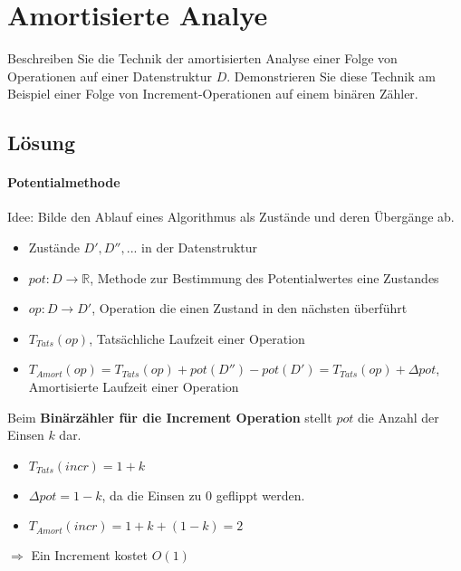 \section{Amortisierte Analye} 
	Beschreiben Sie die Technik der amortisierten Analyse einer Folge von Operationen auf einer Datenstruktur $D$. Demonstrieren Sie diese Technik am Beispiel einer Folge von Increment-Operationen auf einem binären Zähler.
\subsection*{Lösung}
\paragraph{Potentialmethode} Idee: Bilde den Ablauf eines Algorithmus als Zustände und deren Übergänge ab.
\begin{itemize}
    \item[] Zustände $D', D'',...$ in der Datenstruktur
    \item[] $pot:D \rightarrow \mathbb{R}$, Methode zur Bestimmung des Potentialwertes eine Zustandes
    \item[] $op: D\rightarrow D'$, Operation die einen Zustand in den nächsten überführt
    \item[] $ T_{Tats}(op) $, Tatsächliche Laufzeit einer Operation
    \item[] $ T_{Amort}(op) = T_{Tats}(op) + pot(D'') - pot(D') = T_{Tats}(op) + \Delta pot $, Amortisierte Laufzeit einer Operation
\end{itemize}

Beim \textbf{Binärzähler für die Increment Operation} stellt $pot$ die Anzahl der Einsen $ k $ dar.
\begin{itemize}
    \item[] $T_{Tats}(incr) = 1 + k$
    \item[] $\Delta pot = 1-k$, da die Einsen zu 0 geflippt werden. 
    \item[] $T_{Amort}(incr) = 1 + k + (1 - k) = 2$
\end{itemize}
$ \Rightarrow $ Ein Increment kostet $ O(1) $
